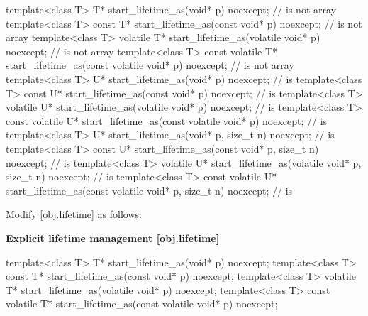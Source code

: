 \begin{addedblock}
\begin{codeblock}
template<class T>
  T* start_lifetime_as(void* p) noexcept;                               //  is not array
template<class T>
  const T* start_lifetime_as(const void* p) noexcept;                   //  is not array
template<class T>
  volatile T* start_lifetime_as(volatile void* p) noexcept;             //  is not array
template<class T>
  const volatile T* start_lifetime_as(const volatile void* p) noexcept; //  is not array
template<class T>
  U* start_lifetime_as(void* p) noexcept;                               //  is 
template<class T>
  const U* start_lifetime_as(const void* p) noexcept;                   //  is 
template<class T>
  volatile U* start_lifetime_as(volatile void* p) noexcept;             //  is 
template<class T>
  const volatile U* start_lifetime_as(const volatile void* p) noexcept; //  is 
template<class T>
  U* start_lifetime_as(void* p, size_t n) noexcept;                     //  is 
template<class T>
  const U* start_lifetime_as(const void* p, size_t n) noexcept;         //  is 
template<class T>
  volatile U* start_lifetime_as(volatile void* p, size_t n) noexcept;   //  is 
template<class T>
  const volatile U* start_lifetime_as(const volatile void* p, size_t n) noexcept; 
                                                                        //  is 
\end{codeblock}
\end{addedblock}

Modify [obj.lifetime] as follows:

\textbf{Explicit lifetime management \hspace{83mm}[obj.lifetime]}

\begin{codeblock}
template<class T>
  T* start_lifetime_as(void* p) noexcept;
template<class T>
  const T* start_lifetime_as(const void* p) noexcept;
template<class T>
  volatile T* start_lifetime_as(volatile void* p) noexcept;
template<class T>
  const volatile T* start_lifetime_as(const volatile void* p) noexcept;
\end{codeblock}

